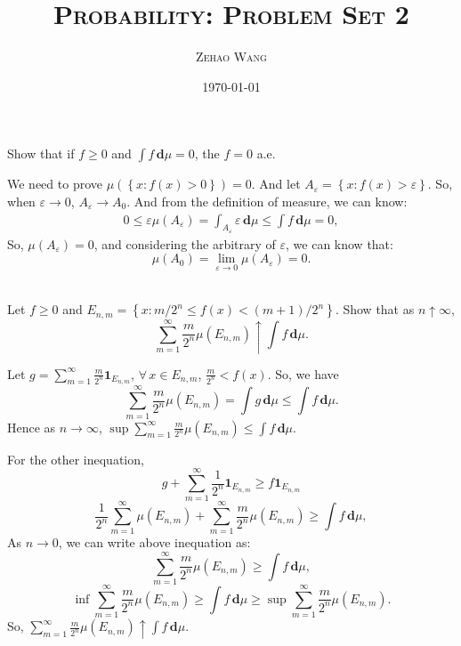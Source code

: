 \documentclass[en, normal, 11pt, black]{elegantnote}
\title{\textsc{Probability: Problem Set 2}}
\author{\textsc{Zehao Wang}}
\date{\today}
\newenvironment{exercise}[1]{\begin{tcolorbox}[colback=black!15, colframe=black!80, breakable, title=#1]}{\end{tcolorbox}}
\renewenvironment{proof}{\begin{tcolorbox}[colback=white, colframe=black!50, breakable, title=Proof. ]\setlength{\parskip}{0.8em}}{\\\rightline{$\square$}\end{tcolorbox}}
\newcommand{\der}{\,\mathbf{d}}
\begin{document}
\maketitle
    \begin{exercise}{1.4.1}
        Show that if $f\geqslant0$ and $\int f\der \mu=0$, the $f=0$ a.e. 
    \end{exercise}

    \begin{proof}
        We need to prove $\mu\left(\left\{x:f(x)>0\right\}\right)=0$. And let $A_\varepsilon=\left\{x:f(x)>\varepsilon\right\}$. So, when $\varepsilon\to0$, $A_\varepsilon\to A_0$. 
        And from the definition of measure, we can know: 
        \begin{align*}
            0\leqslant\varepsilon\mu(A_\varepsilon)=\int_{A_\varepsilon}\varepsilon\der\mu\leqslant\int f\der\mu=0, 
        \end{align*}
        So, $\mu(A_\varepsilon)=0$, and considering the arbitrary of $\varepsilon$, we can know that: 
        \[\mu(A_0)=\lim_{\varepsilon\to0}\mu(A_\varepsilon)=0. \]\vspace{-30pt}
    \end{proof}


    \begin{exercise}{1.4.2}
        Let $f \geq 0$ and $E_{n, m}=\left\{x: m / 2^{n} \leqslant f(x)<(m+1) / 2^{n}\right\}$. Show that as $n \uparrow \infty$, 
        \[
            \sum_{m=1}^{\infty} \frac{m}{2^{n}} \mu\left(E_{n, m}\right) \uparrow \int f \der \mu. 
        \]
    \end{exercise}

    \begin{proof}
        Let $g=\sum_{m=1}^\infty\frac{m}{2^n}\mathbf{1}_{E_{n,m}}$, $\forall\,x\in E_{n,m}$, $\frac{m}{2^n}<f(x)$. So, we have 
        \[
            \sum_{m=1}^\infty\frac{m}{2^n}\mu(E_{n,m})=\int g\der \mu\leqslant\int f\der \mu. 
        \]
        Hence as $n\to\infty$, $\sup \sum_{m=1}^\infty\frac{m}{2^n}\mu(E_{n,m})\leqslant \int f\der \mu$. 

        For the other inequation, 
        \[
            g+\sum_{m=1}^\infty \frac{1}{2^n}\mathbf{1}_{E_{n,m}}\geqslant f\mathbf{1}_{E_{n,m}}
        \]
        \[
            \frac{1}{2^n}\sum_{m=1}^\infty\mu(E_{n,m})+\sum_{m=1}^\infty\frac{m}{2^n}\mu(E_{n,m})\geqslant\int f\der\mu, 
        \]
        As $n\to 0$, we can write above inequation as: 
        \[
            \sum_{m=1}^\infty\frac{m}{2^n}\mu(E_{n,m})\geqslant\int f\der\mu, 
        \]
        \[
            \inf \sum_{m=1}^\infty\frac{m}{2^n}\mu(E_{n,m})\geqslant\int f\der\mu\geqslant\sup \sum_{m=1}^\infty\frac{m}{2^n}\mu(E_{n,m}). 
        \]
        So, $\sum_{m=1}^{\infty} \frac{m}{2^{n}} \mu\left(E_{n, m}\right) \uparrow \int f \der \mu$. 
    \end{proof}
\end{document}
